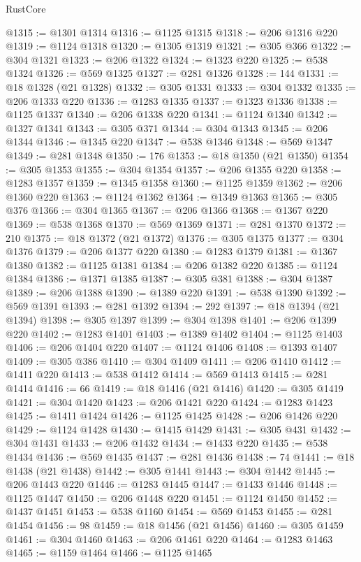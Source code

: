 \begin{lexlean}{RustCore}
\begin{coremodule}
@1315 := @1301 @1314
@1316 := @1125 @1315
@1318 := @206 @1316 @220
@1319 := @1124 @1318
@1320 := @1305 @1319
@1321 := @305 @366
@1322 := @304 @1321
@1323 := @206 @1322
@1324 := @1323 @220
@1325 := @538 @1324
@1326 := @569 @1325
@1327 := @281 @1326
@1328 := 144
@1331 := @18 @1328 (@21 @1328)
@1332 := @305 @1331
@1333 := @304 @1332
@1335 := @206 @1333 @220
@1336 := @1283 @1335
@1337 := @1323 @1336
@1338 := @1125 @1337
@1340 := @206 @1338 @220
@1341 := @1124 @1340
@1342 := @1327 @1341
@1343 := @305 @371
@1344 := @304 @1343
@1345 := @206 @1344
@1346 := @1345 @220
@1347 := @538 @1346
@1348 := @569 @1347
@1349 := @281 @1348
@1350 := 176
@1353 := @18 @1350 (@21 @1350)
@1354 := @305 @1353
@1355 := @304 @1354
@1357 := @206 @1355 @220
@1358 := @1283 @1357
@1359 := @1345 @1358
@1360 := @1125 @1359
@1362 := @206 @1360 @220
@1363 := @1124 @1362
@1364 := @1349 @1363
@1365 := @305 @376
@1366 := @304 @1365
@1367 := @206 @1366
@1368 := @1367 @220
@1369 := @538 @1368
@1370 := @569 @1369
@1371 := @281 @1370
@1372 := 210
@1375 := @18 @1372 (@21 @1372)
@1376 := @305 @1375
@1377 := @304 @1376
@1379 := @206 @1377 @220
@1380 := @1283 @1379
@1381 := @1367 @1380
@1382 := @1125 @1381
@1384 := @206 @1382 @220
@1385 := @1124 @1384
@1386 := @1371 @1385
@1387 := @305 @381
@1388 := @304 @1387
@1389 := @206 @1388
@1390 := @1389 @220
@1391 := @538 @1390
@1392 := @569 @1391
@1393 := @281 @1392
@1394 := 292
@1397 := @18 @1394 (@21 @1394)
@1398 := @305 @1397
@1399 := @304 @1398
@1401 := @206 @1399 @220
@1402 := @1283 @1401
@1403 := @1389 @1402
@1404 := @1125 @1403
@1406 := @206 @1404 @220
@1407 := @1124 @1406
@1408 := @1393 @1407
@1409 := @305 @386
@1410 := @304 @1409
@1411 := @206 @1410
@1412 := @1411 @220
@1413 := @538 @1412
@1414 := @569 @1413
@1415 := @281 @1414
@1416 := 66
@1419 := @18 @1416 (@21 @1416)
@1420 := @305 @1419
@1421 := @304 @1420
@1423 := @206 @1421 @220
@1424 := @1283 @1423
@1425 := @1411 @1424
@1426 := @1125 @1425
@1428 := @206 @1426 @220
@1429 := @1124 @1428
@1430 := @1415 @1429
@1431 := @305 @431
@1432 := @304 @1431
@1433 := @206 @1432
@1434 := @1433 @220
@1435 := @538 @1434
@1436 := @569 @1435
@1437 := @281 @1436
@1438 := 74
@1441 := @18 @1438 (@21 @1438)
@1442 := @305 @1441
@1443 := @304 @1442
@1445 := @206 @1443 @220
@1446 := @1283 @1445
@1447 := @1433 @1446
@1448 := @1125 @1447
@1450 := @206 @1448 @220
@1451 := @1124 @1450
@1452 := @1437 @1451
@1453 := @538 @1160
@1454 := @569 @1453
@1455 := @281 @1454
@1456 := 98
@1459 := @18 @1456 (@21 @1456)
@1460 := @305 @1459
@1461 := @304 @1460
@1463 := @206 @1461 @220
@1464 := @1283 @1463
@1465 := @1159 @1464
@1466 := @1125 @1465

\end{coremodule}
\end{lexlean}
